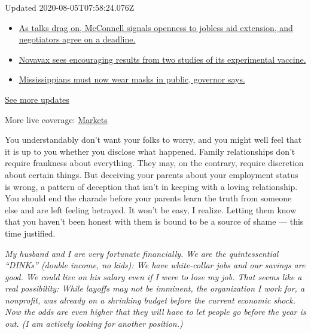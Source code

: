 Updated 2020-08-05T07:58:24.076Z

\begin{itemize}
\tightlist
\item
  \href{https://www.nytimes3xbfgragh.onion/2020/08/04/world/coronavirus-cases.html?action=click\&pgtype=Article\&state=default\&region=MAIN_CONTENT_1\&context=storylines_live_updates\#link-762df92}{As
  talks drag on, McConnell signals openness to jobless aid extension,
  and negotiators agree on a deadline.}
\item
  \href{https://www.nytimes3xbfgragh.onion/2020/08/04/world/coronavirus-cases.html?action=click\&pgtype=Article\&state=default\&region=MAIN_CONTENT_1\&context=storylines_live_updates\#link-1228a480}{Novavax
  sees encouraging results from two studies of its experimental
  vaccine.}
\item
  \href{https://www.nytimes3xbfgragh.onion/2020/08/04/world/coronavirus-cases.html?action=click\&pgtype=Article\&state=default\&region=MAIN_CONTENT_1\&context=storylines_live_updates\#link-794484ed}{Mississippians
  must now wear masks in public, governor says.}
\end{itemize}

\href{https://www.nytimes3xbfgragh.onion/2020/08/04/world/coronavirus-cases.html?action=click\&pgtype=Article\&state=default\&region=MAIN_CONTENT_1\&context=storylines_live_updates}{See
more updates}

More live coverage:
\href{https://www.nytimes3xbfgragh.onion/live/2020/08/04/business/stock-market-today-coronavirus?action=click\&pgtype=Article\&state=default\&region=MAIN_CONTENT_1\&context=storylines_live_updates}{Markets}

You understandably don't want your folks to worry, and you might well
feel that it is up to you whether you disclose what happened. Family
relationships don't require frankness about everything. They may, on the
contrary, require discretion about certain things. But deceiving your
parents about your employment status is wrong, a pattern of deception
that isn't in keeping with a loving relationship. You should end the
charade before your parents learn the truth from someone else and are
left feeling betrayed. It won't be easy, I realize. Letting them know
that you haven't been honest with them is bound to be a source of shame
--- this time justified.

\emph{My husband and I are very fortunate financially. We are the
quintessential ``DINKs'' (double income, no kids): We have white-collar
jobs and our savings are good. We could live on his salary even if I
were to lose my job. That seems like a real possibility: While layoffs
may not be imminent, the organization I work for, a nonprofit, was
already on a shrinking budget before the current economic shock. Now the
odds are even higher that they will have to let people go before the
year is out. (I am actively looking for another position.)}

